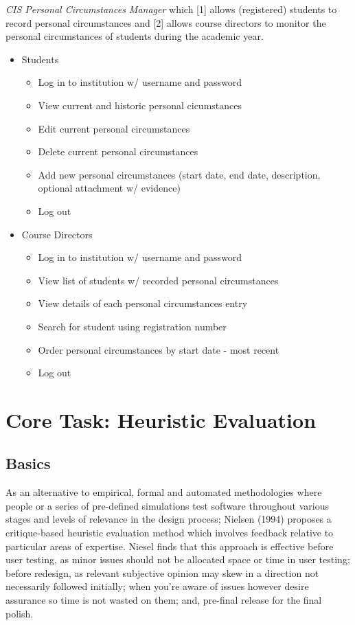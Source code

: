 \documentclass[11pt, english]{article}
\begin{document}
	\textit{CIS Personal Circumstances Manager} which [1] allows (registered) students to record personal circumstances and [2] allows course directors to monitor the personal circumstances of students during the academic year.

	\begin{itemize}
	\setlength\itemsep{0cm}
		\item Students
		\begin{itemize}
			\item Log in to institution w/ username and password
			\item View current and historic personal cicumstances
			\item Edit current personal circumstances
			\item Delete current personal circumstances
			\item Add new personal circumstances (start date, end date, description, optional attachment w/ evidence)
			\item Log out
		\end{itemize}
		\item Course Directors
		\begin{itemize}
			\item Log in to institution w/ username and password
			\item View list of students w/ recorded personal circumstances
			\item View details of each personal circumstances entry
			\item Search for student using registration number
			\item Order personal circumstances by start date - most recent
			\item Log out
		\end{itemize}
	\end{itemize}	

\newpage

\section{Core Task: Heuristic Evaluation}

	\subsection{Basics}

	As an alternative to empirical, formal and automated methodologies where people or a series of pre-defined simulations test software throughout various stages and levels of relevance in the design process; Nielsen (1994) proposes a critique-based heuristic evaluation method which involves feedback relative to particular areas of expertise. Niesel finds that this approach is effective before user testing, as minor issues should not be allocated space or time in user testing; before redesign, as relevant subjective opinion may skew in a direction not necessarily followed initially; when you're aware of issues however desire assurance so time is not wasted on them; and, pre-final release for the final polish.\\
\end{document}
